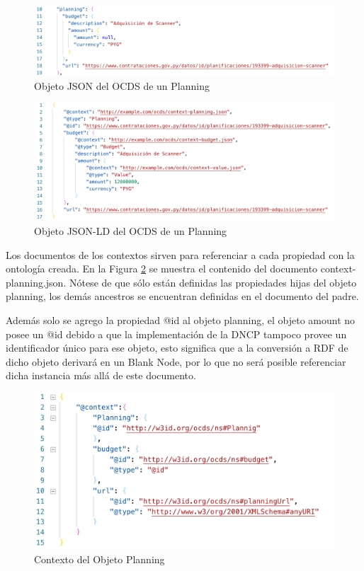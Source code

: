 \begin{figure}[h!]
    \centering
    \includegraphics[width=150mm]{figuras/2}
    \caption{Objeto JSON del OCDS de un Planning}
    \label{img:json2}
    \end{figure}

\begin{figure}[h!]
    \centering
    \includegraphics[width=150mm]{figuras/3}
    \caption{Objeto JSON-LD del OCDS de un Planning}
    \label{img:json3}
    \end{figure}


Los documentos de los contextos sirven para referenciar a cada propiedad con la ontología creada. En la Figura \ref{img:json3} se muestra el contenido del documento context-planning.json. Nótese de que sólo están definidas las propiedades hijas del objeto planning, los demás ancestros se encuentran definidas en el documento del padre.

Además solo se agrego la propiedad @id al objeto planning, el objeto amount no posee un @id debido a que la implementación de la DNCP tampoco provee un identificador único para ese objeto, esto significa que a la conversión a RDF de dicho objeto derivará en un Blank Node, por lo que no será posible referenciar dicha instancia más allá de este documento.


\begin{figure}[h!]
    \centering
    \includegraphics[width=150mm]{figuras/4}
    \caption{Contexto del Objeto Planning }
    \label{img:json4}
    \end{figure}


